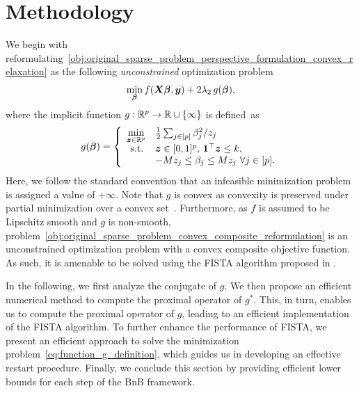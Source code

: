\section{Methodology}
\label{sec:methodology}

We begin with reformulating~\eqref{obj:original_sparse_problem_perspective_formulation_convex_relaxation} as the following \textit{unconstrained} optimization problem
\begin{align}
    \label{obj:original_sparse_problem_convex_composite_reformulation}
    \min_{\bm{\beta}} f(\bm{X} \bm{\beta}, \bm{y}) + 2 \lambda_2 \, g(\bm{\beta}),
\end{align}
where the implicit function $g: \mathbb{R}^p \to \mathbb{R} \cup \{ \infty \}$ is defined~as
\begin{align}
    \label{eq:function_g_definition}
    g(\bm{\beta}) = \left\{ 
    \begin{array}{cl}
        \min\limits_{\bm{z} \in \mathbb{R}^p} & \frac{1}{2} \sum_{j \in [p]} \beta_j^2 / z_j \\[1ex]
        \operatorname{s.\!t.\!} & \bm{z} \in [0, 1]^p, \, \bm 1^\top \bm{z} \leq k, \\
        & -M z_j \leq \beta_j \leq M z_j ~ \forall j \in [p].
    \end{array} 
    \right.
\end{align}
Here, we follow the standard convention that an infeasible minimization problem is assigned a value of $+\infty$. 
Note that $g$ is convex as convexity is preserved under partial minimization over a convex set~\citep[Theorem~5,3]{rockafellar1970convex}. 
Furthermore, as $f$ is assumed to be Lipschitz smooth and $g$ is non-smooth, problem~\eqref{obj:original_sparse_problem_convex_composite_reformulation} is an unconstrained optimization problem with a convex composite objective function. As such, it is amenable to be solved using the FISTA algorithm proposed in \citep{beck2009fast}. 

In the following, we first analyze the conjugate of $g$. We then propose an efficient numerical method to compute the proximal operator of $g^*$. This, in turn, enables us to compute the proximal operator of $g$, leading to an efficient implementation of the FISTA algorithm. To further enhance the performance of FISTA, we present an efficient approach to solve the minimization problem~\eqref{eq:function_g_definition}, which guides us in developing an effective restart procedure. Finally, we conclude this section by providing efficient lower bounds for each step of the BnB framework.

